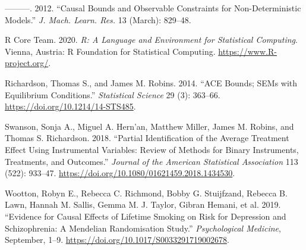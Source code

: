 \documentclass[
]{article}
\theoremstyle{plain}
\begin{document}
\leavevmode\hypertarget{ref-ramsahai_causal_2012}{}%
---------. 2012. ``Causal Bounds and Observable Constraints for Non-Deterministic Models.'' \emph{J. Mach. Learn. Res.} 13 (March): 829--48.

\leavevmode\hypertarget{ref-R}{}%
R Core Team. 2020. \emph{R: A Language and Environment for Statistical Computing}. Vienna, Austria: R Foundation for Statistical Computing. \url{https://www.R-project.org/}.

\leavevmode\hypertarget{ref-richardson_ace_2014}{}%
Richardson, Thomas S., and James M. Robins. 2014. ``ACE Bounds; SEMs with Equilibrium Conditions.'' \emph{Statistical Science} 29 (3): 363--66. \url{https://doi.org/10.1214/14-STS485}.

\leavevmode\hypertarget{ref-swanson_partial_2018}{}%
Swanson, Sonja A., Miguel A. Hern\a'an, Matthew Miller, James M. Robins, and Thomas S. Richardson. 2018. ``Partial Identification of the Average Treatment Effect Using Instrumental Variables: Review of Methods for Binary Instruments, Treatments, and Outcomes.'' \emph{Journal of the American Statistical Association} 113 (522): 933--47. \url{https://doi.org/10.1080/01621459.2018.1434530}.

\leavevmode\hypertarget{ref-wootton_evidence_2019}{}%
Wootton, Robyn E., Rebecca C. Richmond, Bobby G. Stuijfzand, Rebecca B. Lawn, Hannah M. Sallis, Gemma M. J. Taylor, Gibran Hemani, et al. 2019. ``Evidence for Causal Effects of Lifetime Smoking on Risk for Depression and Schizophrenia: A Mendelian Randomisation Study.'' \emph{Psychological Medicine}, September, 1--9. \url{https://doi.org/10.1017/S0033291719002678}.
\end{document}
